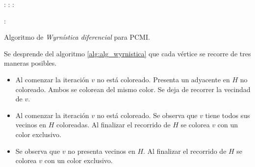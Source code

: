 \begin{algorithm}[H]
    \begin{algorithmic}[1]
        \State
        :
             
             
            : 
                :
                    \label{alg-line:wyrnistica-vecindad}
                    \State{}
                \EndFor
            \EndFor
    
            : 
                     
                \EndIf
            \EndFor
    
             
        \EndFunction
        \State{}
    \end{algorithmic}
    \caption{Algoritmo de \textit{Wyrnística diferencial} para PCMI.}
    \label{alg:alg_wyrnistica}
\end{algorithm}

Se desprende del algoritmo \ref{alg:alg_wyrnistica} que cada vértice se recorre de tres maneras posibles.

\begin{itemize}
    \item Al comenzar la iteración $v$ no está coloreado. Presenta un adyacente en $H$ no coloreado. Ambos se colorean del mismo color. Se deja de recorrer la vecindad de $v$.
    \item Al comenzar la iteración $v$ no está coloreado. Se observa que $v$ tiene todos sus vecinos en $H$ coloreadas. Al finalizar el recorrido de $H$ se colorea $v$ con un color exclusivo.
    \item Se observa que $v$ no presenta vecinos en $H$. Al finalizar el recorrido de $H$ se colorea $v$ con un color exclusivo.
\end{itemize}

